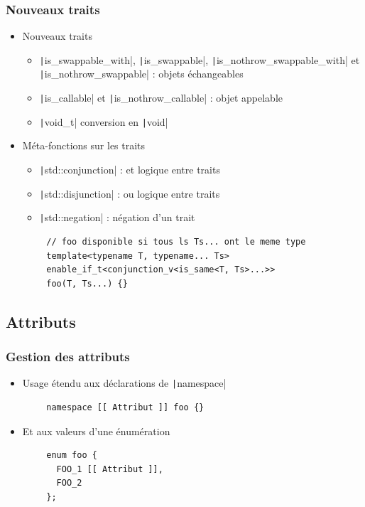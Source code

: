 \documentclass[C++.tex]{subfiles}
\begin{document}
\begin{frame}[fragile]
	\frametitle{Nouveaux traits}
	\begin{itemize}
		\item Nouveaux traits
		\begin{itemize}
			\item \texttt|is_swappable_with|, \texttt|is_swappable|, \texttt|is_nothrow_swappable_with| et \texttt|is_nothrow_swappable| : objets échangeables
			\item \texttt|is_callable| et \texttt|is_nothrow_callable| : objet appelable
			\item \texttt|void_t| conversion en \texttt|void|


		\end{itemize}
		\item Méta-fonctions sur les traits
		\begin{itemize}
			\item \texttt|std::conjunction| : et logique entre traits
			\item \texttt|std::disjunction| : ou logique entre traits
			\item \texttt|std::negation| : négation d'un trait
		\end{itemize}
	\end{itemize}

	\begin{verbatim}
		// foo disponible si tous ls Ts... ont le meme type
		template<typename T, typename... Ts>
		enable_if_t<conjunction_v<is_same<T, Ts>...>>
		foo(T, Ts...) {}
	\end{verbatim}
\end{frame}

\subsection*{Attributs}
\begin{frame}[fragile]
	\frametitle{Gestion des attributs}
	\begin{itemize}
		\item Usage étendu aux déclarations de \texttt|namespace|
	\end{itemize}

	\begin{verbatim}
		namespace [[ Attribut ]] foo {}
	\end{verbatim}

	\begin{itemize}
		\item Et aux valeurs d'une énumération
	\end{itemize}

	\begin{verbatim}
		enum foo {
		  FOO_1 [[ Attribut ]],
		  FOO_2
		};
	\end{verbatim}
\end{frame}
\end{document}
